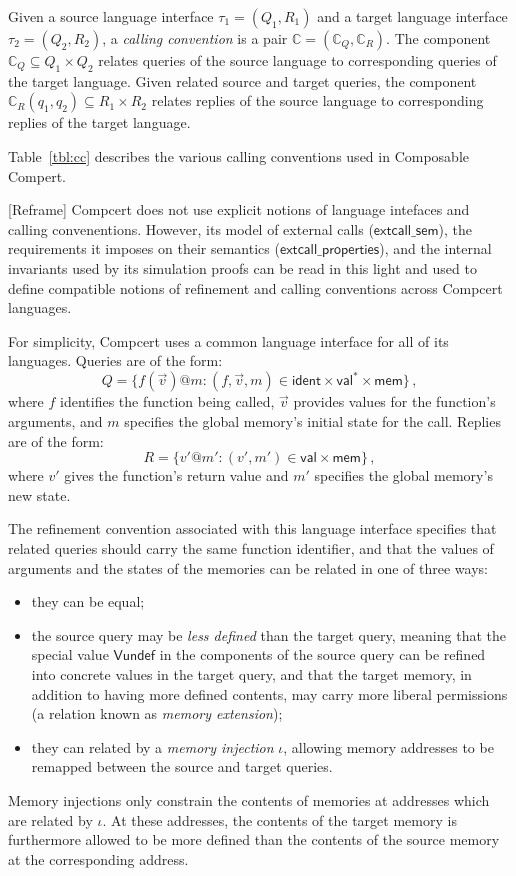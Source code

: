 \documentclass[acmsmall,10pt,review,anonymous]{acmart}
\newcommand{\kw}[1]{\ensuremath{ \textsf{#1} }}
\begin{document}
\begin{definition}
Given a source language interface $\tau_1 = (Q_1, R_1)$ and
a target language interface $\tau_2 = (Q_2, R_2)$,
a \emph{calling convention} is a pair
$\mathbb{C} = (\mathbb{C}_Q, \mathbb{C}_R)$.
The component
$\mathbb{C}_Q \subseteq Q_1 \times Q_2$
relates queries of the source language to
corresponding queries of the target language.
Given related source and target queries,
the component
$\mathbb{C}_R(q_1, q_2) \subseteq R_1 \times R_2$
relates replies of the source language to
corresponding replies of the target language.
\end{definition}

Table~\ref{tbl:cc} describes the various calling conventions
used in Composable Compert.

[Reframe] Compcert does not use explicit notions of
language intefaces and calling convenentions.
However,
its model of external calls
(\kw{extcall\_sem}),
the requirements it imposes on their semantics
(\kw{extcall\_properties}),
and the internal invariants used by its simulation proofs
can be read in this light
and used to define
compatible notions of refinement and calling conventions
across Compcert languages.

For simplicity,
Compcert uses a common language interface
for all of its languages.
Queries are of the form:
\[
  Q = \{ f(\vec{v})@m : (f, \vec{v}, m) \in
    \kw{ident} \times \kw{val}^* \times \kw{mem} \} \,,
\]
where $f$ identifies the function being called,
$\vec{v}$ provides values for the function's arguments, and
$m$ specifies the global memory's initial state for the call.
Replies are of the form:
\[
  R = \{ v'@m' : (v', m') \in
    \kw{val} \times \kw{mem} \} \,,
\]
where $v'$ gives the function's return value and
$m'$ specifies the global memory's new state.

The refinement convention associated with this language interface
specifies that
related queries should carry the same function identifier,
and that the values of arguments and the states of the memories
can be related in one of three ways:
\begin{itemize}
\item they can be equal;
\item the source query may be
  \emph{less defined} than the target query,
  meaning that the special value $\kw{Vundef}$
  in the components of the source query
  can be refined into concrete values in the target query,
  and that the target memory,
  in addition to having more defined contents,
  may carry more liberal permissions
  (a relation known as \emph{memory extension});
\item they can related by a \emph{memory injection} $\iota$,
  allowing memory addresses to be remapped
  between the source and target queries.
\end{itemize}
Memory injections only constrain the contents of memories
at addresses which are related by $\iota$.
At these addresses,
the contents of the target memory is furthermore
allowed to be more defined than the contents of the source
memory at the corresponding address.
\end{document}
